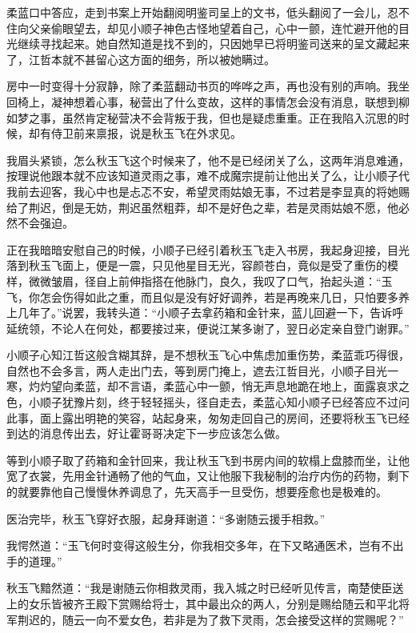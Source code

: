 柔蓝口中答应，走到书案上开始翻阅明鉴司呈上的文书，低头翻阅了一会儿，忍不住向父亲偷眼望去，却见小顺子神色古怪地望着自己，心中一颤，连忙避开他的目光继续寻找起来。她自然知道是找不到的，只因她早已将明鉴司送来的呈文藏起来了，江哲本就不甚留心这方面的细务，所以被她瞒过。

房中一时变得十分寂静，除了柔蓝翻动书页的哗哗之声，再也没有别的声响。我坐回椅上，凝神想着心事，秘营出了什么变故，这样的事情怎会没有消息，联想到柳如梦之事，虽然肯定秘营决不会背叛于我，但也是疑虑重重。正在我陷入沉思的时候，却有侍卫前来禀报，说是秋玉飞在外求见。

我眉头紧锁，怎么秋玉飞这个时候来了，他不是已经闭关了么，这两年消息难通，按理说他跟本就不应该知道灵雨之事，难不成魔宗提前让他出关了么，让小顺子代我前去迎客，我心中也是忐忑不安，希望灵雨姑娘无事，不过若是李显真的将她赐给了荆迟，倒是无妨，荆迟虽然粗莽，却不是好色之辈，若是灵雨姑娘不愿，他必然不会强迫。

正在我暗暗安慰自己的时候，小顺子已经引着秋玉飞走入书房，我起身迎接，目光落到秋玉飞面上，便是一震，只见他星目无光，容颜苍白，竟似是受了重伤的模样，微微皱眉，径自上前伸指搭在他脉门，良久，我叹了口气，抬起头道：“玉飞，你怎会伤得如此之重，而且似是没有好好调养，若是再晚来几日，只怕要多养上几年了。”说罢，我转头道：“小顺子去拿药箱和金针来，蓝儿回避一下，告诉呼延统领，不论人在何处，都要接过来，便说江某多谢了，翌日必定亲自登门谢罪。”

小顺子心知江哲这般含糊其辞，是不想秋玉飞心中焦虑加重伤势，柔蓝乖巧得很，自然也不会多言，两人走出门去，等到房门掩上，遮去江哲目光，小顺子目光一寒，灼灼望向柔蓝，却不言语，柔蓝心中一颤，悄无声息地跪在地上，面露哀求之色，小顺子犹豫片刻，终于轻轻摇头，径自走去，柔蓝心知小顺子已经答应不过问此事，面上露出明艳的笑容，站起身来，匆匆走回自己的房间，还要将秋玉飞已经到达的消息传出去，好让霍哥哥决定下一步应该怎么做。

等到小顺子取了药箱和金针回来，我让秋玉飞到书房内间的软榻上盘膝而坐，让他宽了衣裳，先用金针通畅了他的气血，又让他服下我秘制的治疗内伤的药物，剩下的就要靠他自己慢慢休养调息了，先天高手一旦受伤，想要痊愈也是极难的。

医治完毕，秋玉飞穿好衣服，起身拜谢道：“多谢随云援手相救。”

我愕然道：“玉飞何时变得这般生分，你我相交多年，在下又略通医术，岂有不出手的道理。”

秋玉飞黯然道：“我是谢随云你相救灵雨，我入城之时已经听见传言，南楚使臣送上的女乐皆被齐王殿下赏赐给将士，其中最出众的两人，分别是赐给随云和平北将军荆迟的，随云一向不爱女色，若非是为了救下灵雨，怎会接受这样的赏赐呢？”

